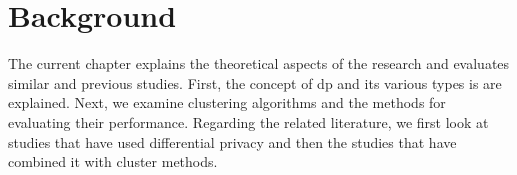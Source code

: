 \chapter{Background}
The current chapter explains the theoretical aspects of the research and evaluates similar and previous studies.
First, the concept of \gls{dp} and its various types is are explained.
Next, we examine clustering algorithms and the methods for evaluating their performance.
Regarding the related literature, we first look at studies that have used differential privacy and then the studies that have combined it with cluster methods.



